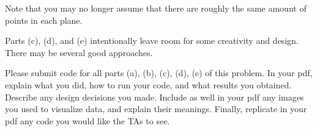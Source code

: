 \documentclass[conference,onecolumn]{IEEEtran}
\begin{document}
\begin{enumerate}[label=\arabic{enumi}.]
\begin{enumerate}
                    Note that you may no longer assume that there are roughly the same amount of points in each plane.
          \end{enumerate}
          Parts (c), (d), and (e) intentionally leave room for some creativity and design.
          There may be several good approaches.

          Please submit code for all parts (a), (b), (c), (d), (e) of this problem.
          In your pdf, explain what you did, how to run your code, and what results you obtained.
          Describe any design decisions you made.
          Include as well in your pdf any images you used to visualize data, and explain their meanings.
          Finally, replicate in your pdf any code you would like the TAs to see.
\end{enumerate}
\end{document}
